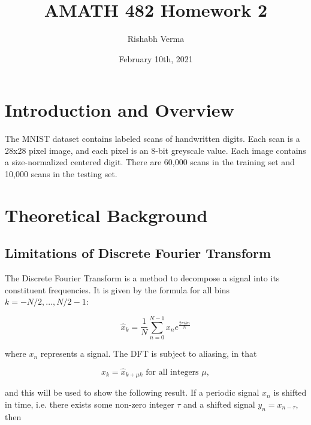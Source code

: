 \documentclass{article}
\title{AMATH 482 Homework 2}
\author{Rishabh Verma}
\date{February 10th, 2021}
\begin{document}
\maketitle

\begin{abstract}
\end{abstract}

\section{Introduction and Overview}
The MNIST dataset contains labeled scans of handwritten digits. Each scan is a 28x28 pixel image, and each pixel is an 8-bit greyscale value. Each image contains a size-normalized centered digit. There are 60,000 scans in the training set and 10,000 scans in the testing set.


\section{Theoretical Background}
\subsection{Limitations of Discrete Fourier Transform}
The Discrete Fourier Transform is a method to decompose a signal into its constituent frequencies. It is given by the formula for all bins $k = -N/2,...,N/2-1$: 

\begin{equation}
	\hat{x}_k = \dfrac{1}{N}\sum_{n=0}^{N-1} x_n e^{\tfrac{2\pi i k n}{N}}
	\label{eqn:fourier}
\end{equation}

where $x_n$ represents a signal. The DFT is subject to aliasing, in that

\begin{equation}
	\hat{x}_k = \hat{x}_{k+\mu k} \text{ for all integers } \mu,
	\label{aliasing}
\end{equation}

and this will be used to show the following result. If a periodic signal $x_n$ is shifted in time, i.e. there exists some non-zero integer $\tau$ and a shifted signal $y_n = x_{n-\tau}$, then 
\end{document}
